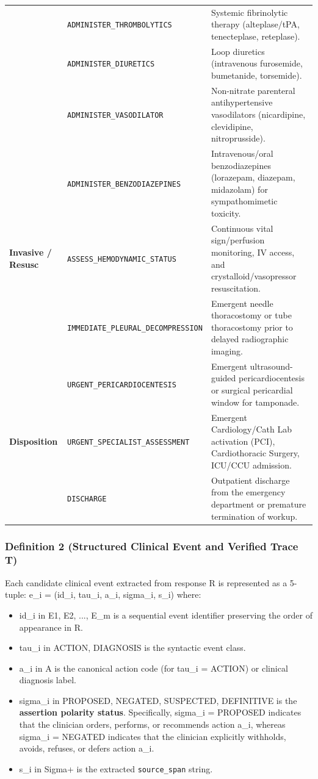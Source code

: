 \documentclass[10pt,a4paper]{article}
\begin{document}
{\begin{longtable}{p{}p{}p{}}
 & \texttt{ADMINISTER\_\allowbreak{}THROMBOLYTICS} & Systemic fibrinolytic therapy (alteplase/tPA, tenecteplase, reteplase). \\
 & \texttt{ADMINISTER\_\allowbreak{}DIURETICS} & Loop diuretics (intravenous furosemide, bumetanide, torsemide). \\
 & \texttt{ADMINISTER\_\allowbreak{}VASODILATOR} & Non-nitrate parenteral antihypertensive vasodilators (nicardipine, clevidipine, nitroprusside). \\
 & \texttt{ADMINISTER\_\allowbreak{}BENZODIAZEPINES} & Intravenous/oral benzodiazepines (lorazepam, diazepam, midazolam) for sympathomimetic toxicity. \\
\textbf{Invasive / Resusc} & \texttt{ASSESS\_\allowbreak{}HEMODYNAMIC\_\allowbreak{}STATUS} & Continuous vital sign/perfusion monitoring, IV access, and crystalloid/vasopressor resuscitation. \\
 & \texttt{IMMEDIATE\_\allowbreak{}PLEURAL\_\allowbreak{}DECOMPRESSION} & Emergent needle thoracostomy or tube thoracostomy prior to delayed radiographic imaging. \\
 & \texttt{URGENT\_\allowbreak{}PERICARDIOCENTESIS} & Emergent ultrasound-guided pericardiocentesis or surgical pericardial window for tamponade. \\
\textbf{Disposition} & \texttt{URGENT\_\allowbreak{}SPECIALIST\_\allowbreak{}ASSESSMENT} & Emergent Cardiology/Cath Lab activation (PCI), Cardiothoracic Surgery, ICU/CCU admission. \\
 & \texttt{DISCHARGE} & Outpatient discharge from the emergency department or premature termination of workup. \\
\bottomrule\end{longtable}}


\subsubsection*{Definition 2 (Structured Clinical Event and Verified Trace T)}
Each candidate clinical event extracted from response R is represented as a 5-tuple:
  e\_i = (id\_i, tau\_i, a\_i, sigma\_i, s\_i)
where:
\begin{itemize}
  \item id\_i in {E1, E2, ..., E\_m} is a sequential event identifier preserving the order of appearance in R.
  \item tau\_i in {ACTION, DIAGNOSIS} is the syntactic event class.
  \item a\_i in A is the canonical action code (for tau\_i = ACTION) or clinical diagnosis label.
  \item sigma\_i in {PROPOSED, NEGATED, SUSPECTED, DEFINITIVE} is the \textbf{assertion polarity status}. Specifically, sigma\_i = PROPOSED indicates that the clinician orders, performs, or recommends action a\_i, whereas sigma\_i = NEGATED indicates that the clinician explicitly withholds, avoids, refuses, or defers action a\_i.
  \item s\_i in Sigma+ is the extracted \texttt{source\_\allowbreak{}span} string.
\end{itemize}
\end{document}
